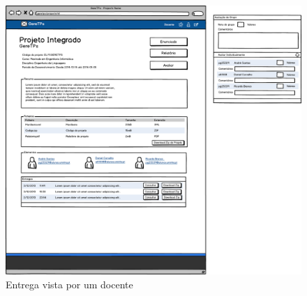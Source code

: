 \begin{figure}[H]
        \centering
        \includegraphics[width=1\textwidth]{images/prototipos/mockups/projetodocente.png}
         \caption{Entrega vista por um docente}
         \label{fig: projetodocente}
\end{figure}
